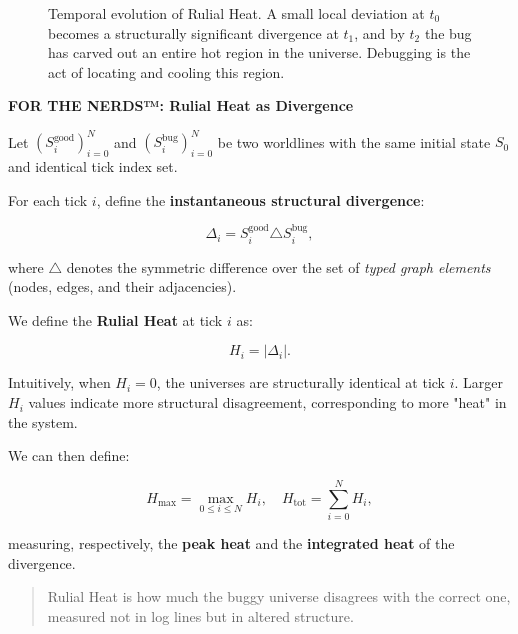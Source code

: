 \begin{figure}[h]
\caption{Temporal evolution of Rulial Heat. A small local deviation at $t_0$
becomes a structurally significant divergence at $t_1$, and by $t_2$ the bug
has carved out an entire hot region in the universe. Debugging is the act of
locating and cooling this region.}
\label{fig:rulial-heat-animation}
\end{figure}

\begin{mdframed}[linewidth=1pt, linecolor=black!50, innertopmargin=8pt, innerbottommargin=8pt]
\noindent\textbf{FOR THE NERDS™: Rulial Heat as Divergence}

\medskip

Let $(S_i^{\mathrm{good}})_{i=0}^N$ and $(S_i^{\mathrm{bug}})_{i=0}^N$ be two worldlines
with the same initial state $S_0$ and identical tick index set.

For each tick $i$, define the \textbf{instantaneous structural divergence}:

\[
\Delta_i
= S_i^{\mathrm{good}} \triangle S_i^{\mathrm{bug}},
\]

where $\triangle$ denotes the symmetric difference over the set of
\emph{typed graph elements} (nodes, edges, and their adjacencies).

We define the \textbf{Rulial Heat} at tick $i$ as:

\[
H_i = |\Delta_i|.
\]

Intuitively, when $H_i = 0$, the universes are structurally identical at tick $i$. Larger $H_i$ values indicate more structural disagreement, corresponding to more "heat" in the system.

We can then define:

\[
H_{\max} = \max_{0 \le i \le N} H_i,
\quad
H_{\mathrm{tot}} = \sum_{i=0}^N H_i,
\]

measuring, respectively, the \textbf{peak heat} and the \textbf{integrated heat} of the divergence.

\begin{quote}
Rulial Heat is how much the buggy universe disagrees with the correct one, measured
not in log lines but in altered structure.
\end{quote}

\end{mdframed}

